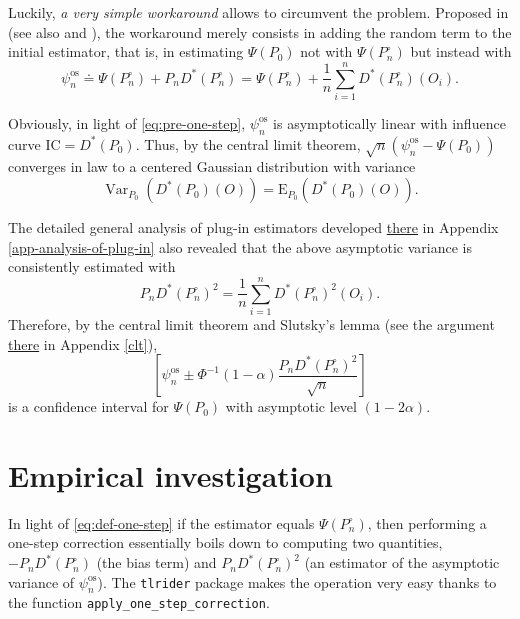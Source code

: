 \documentclass[11pt,openright,twoside]{book}
\DeclareMathOperator{\Var}{Var}
\newcommand{\defq}{\doteq}
\newcommand{\Exp}{\textrm{E}}
\newcommand{\IC}{\textrm{IC}}
\newcommand{\psinos}{\psi_{n}^{\textrm{os}}}
\newcommand{\Phat}{P^{\circ}}
\theoremstyle{definition}
\theoremstyle{definition}
\theoremstyle{definition}
\theoremstyle{remark}
\begin{document}
Luckily, \emph{a very simple workaround} allows to circumvent the problem. Proposed
in \citep{LeCam69} (see also \citep{Pfanzagl82} and \citep{vdV98}), the workaround merely
consists in adding the random term to the initial estimator, that is, in
estimating \(\Psi(P_0)\) not with \(\Psi(\Phat_n)\) but instead with
\begin{equation}
\psinos  \defq  \Psi(\Phat_n)  +  P_{n} D^*(\Phat_n)  =  \Psi(\Phat_n)  +
\frac{1}{n} \sum_{i=1}^{n} D^*(\Phat_n)(O_{i}). \label{eq:def-one-step}
\end{equation}

Obviously, in light of \eqref{eq:pre-one-step}, \(\psinos\) is asymptotically
linear with influence curve \(\IC=D^{*}(P_{0})\). Thus, by the central limit
theorem, \(\sqrt{n} (\psinos - \Psi(P_0))\) converges in law to a centered
Gaussian distribution with variance
\begin{equation}
  \Var_{P_0}(D^{*}(P_{0})(O)) = \Exp_{P_0}(D^{*}(P_{0})(O)).
\end{equation}

The detailed general analysis of plug-in estimators
developed \protect\hyperlink{app-analysis-of-plug-in}{there} in Appendix
\ref{app-analysis-of-plug-in} also revealed that the above asymptotic
variance is consistently estimated with \begin{equation}    P_{n}
D^{*}(\Phat_{n})^{2}  =  \frac{1}{n}  \sum_{i=1}^{n}  D^*(\Phat_n)^{2}(O_{i}).
\end{equation} Therefore, by the central limit theorem and Slutsky's lemma
(see the argument \protect\hyperlink{clt}{there} in Appendix \ref{clt}), \begin{equation*}
\left[\psinos           \pm          \Phi^{-1}(1-\alpha)           \frac{P_{n}
D^{*}(\Phat_{n})^{2}}{\sqrt{n}}\right]   \end{equation*} is a confidence
interval for \(\Psi(P_0)\) with asymptotic level \((1-2\alpha)\).

\hypertarget{empirical-inves-one-step}{%
\section{Empirical investigation}\label{empirical-inves-one-step}}

In light of \eqref{eq:def-one-step} if the estimator equals \(\Psi(\Phat_{n})\),
then performing a one-step correction essentially boils down to computing two
quantities, \(-P_{n} D^{*}(\Phat_{n})\) (the bias term) and \(P_{n} D^{*}(\Phat_{n})^{2}\) (an estimator of the asymptotic variance of
\(\psinos\)). The \texttt{tlrider} package makes the operation very easy thanks to the
function \texttt{apply\_one\_step\_correction}.
\end{document}
